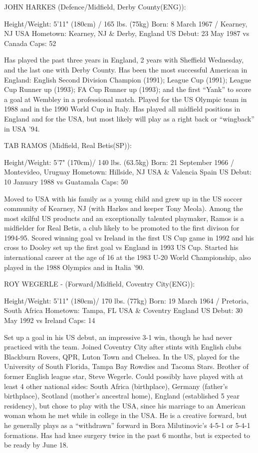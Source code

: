 JOHN HARKES (Defence/Midfield, Derby County(ENG)):

Height/Weight: 5'11" (180cm) / 165 lbs. (75kg)
Born: 8 March 1967 / Kearney, NJ USA
Hometown: Kearney, NJ \& Derby, England
US Debut: 23 May 1987 vs Canada
Caps: 52

Has played the past three years in England, 2 years with Sheffield Wednesday, 
and the last one with Derby County. Has been the most successful American in 
England: English Second Division Champion (1991); League Cup (1991); League Cup
Runner up (1993); FA Cup Runner up (1993); and the first ``Yank'' to score a goal
at Wembley in a professional match. Played for the US Olympic team in 1988 and 
in the 1990 World Cup in Italy. Has played all midfield positions in England
and for the USA, but most likely will play as a right back or ``wingback'' in 
USA '94.


TAB RAMOS (Midfield, Real Betis(SP)):

Height/Weight: 5'7" (170cm)/ 140 lbs. (63.5kg)
Born: 21 September 1966 / Montevideo, Uruguay
Hometown: Hillside, NJ USA \& Valencia Spain
US Debut: 10 January 1988 vs Guatamala
Caps: 50

Moved to USA with his family as a young child and grew up in the US soccer 
community of Kearney, NJ (with Harkes and keeper Tony Meola). Among the most 
skilful US products and an exceptionally talented playmaker, Ramos is a 
midfielder for Real Betis, a club likely to be promoted to the first divison 
for 1994-95. Scored winning goal vs Ireland in the first US Cup game in 1992 
and his cross to Dooley set up the first goal vs England in 1993 US Cup. 
Started his international career at the age of 16 at the 1983 U-20 World 
Championship, also played in the 1988 Olympics and in Italia '90.

ROY WEGERLE - (Forward/Midfield, Coventry City(ENG)):

Height/Weight: 5'11" (180cm)/ 170 lbs. (77kg)
Born: 19 March 1964 / Pretoria, South Africa
Hometown: Tampa, FL USA \& Coventry England
US Debut: 30 May 1992 vs Ireland
Caps: 14

Set up a goal in his US debut, an impressive 3-1 win, though he had never 
practiced with the team. Joined Coventry City after stints with English clubs 
Blackburn Rovers, QPR, Luton Town and Chelsea. In the US, played for the 
University of South Florida, Tampa Bay Rowdies and Tacoma Stars. Brother of 
former English league star, Steve Wegerle. Could possibly have played with at
least 4 other national sides: South Africa (birthplace), Germany (father's 
birthplace), Scotland (mother's ancestral home), England (established 5 year 
residency), but chose to play with the USA, since his marriage to an American 
woman whom he met while in college in the USA. He is a creative forward, but he
generally plays as a ``withdrawn'' forward in Bora Milutinovic's 4-5-1 or 5-4-1 
formations. Has had knee surgery twice in the past 6 months, but is expected to
be ready by June 18.


